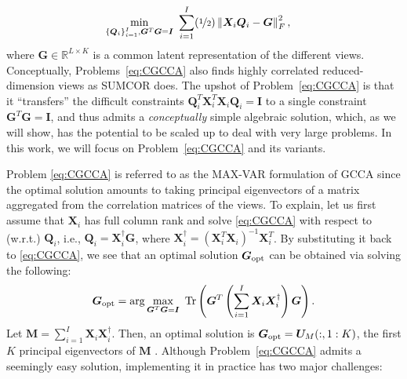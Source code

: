 \documentclass[10pt,journal]{IEEEtran}
\newcommand{\G}{\boldsymbol{G}}
\newcommand{\Q}{\boldsymbol{Q}}
\newcommand{\X}{\boldsymbol{X}}
\begin{document}
\begin{equation}\label{eq:CGCCA}
\begin{aligned}
\min_{\{{\bm Q}_i\}_{i=1}^I,{\bm G}^T{\bm G}={\bm I}} &~\sum_{i=1}^{I}(\nicefrac{1}{2})\left\|{\bm X}_i{\bm Q}_i-{\bm G}\right\|_F^2,
\end{aligned}
\end{equation}
where ${\bm G}\in\mathbb{R}^{L\times K}$ is a common latent representation of the different views.
Conceptually, Problems~\eqref{eq:CGCCA} also finds highly correlated reduced-dimension views as SUMCOR does. 
The upshot of Problem~\eqref{eq:CGCCA} is that it ``transfers'' the difficult constraints ${\bm Q}_i^T\X_i^T\X_i\Q_i={\bm I}$ to a single constraint $\G^T\G={\bm I}$, and thus admits a {\em conceptually} simple algebraic solution, which, as we will show, has the potential to be scaled up to deal with very large problems.
In this work, we will focus on Problem~\eqref{eq:CGCCA} and its variants.

Problem \eqref{eq:CGCCA} is referred to as the MAX-VAR formulation of GCCA since the optimal solution amounts to taking principal eigenvectors of a matrix aggregated from the correlation matrices of the views.
To explain, let us first assume that ${\bm X}_i$ has full column rank
and solve \eqref{eq:CGCCA} with respect to (w.r.t.) $\Q_i$, i.e., ${\bm Q}_i={\bm X}_i^\dag{\bm G}$, where ${\bm X}_i^\dag=({\bm X}_i^T{\bm X}_i)^{-1}{\bm X}_i^T$. By substituting it back to \eqref{eq:CGCCA}, we see that an optimal solution ${\bm G}_{\rm opt}$ can be obtained via solving the following:
\begin{equation}
\begin{aligned}
{\bm G}_{\rm opt} = \arg\max_{{\bm G}^T{\bm G} = {\bm I}} ~ {\rm Tr}\left({\bm G}^T\left(\sum_{i=1}^I {\bm X}_i{\bm X}_i^\dag\right){\bm G}\right). \label{eq:new_obj}
\end{aligned}
\end{equation}
Let ${\bm M} = \sum_{i=1}^I {\bm X}_i{\bm X}_i^\dag$.
Then, an optimal solution is ${\bm G}_{\rm opt}={\bm U}_M(:,1:K)$, 
the first $K$ principal eigenvectors of ${\bm M}$ \cite{GHGolub1996}.
Although Problem~\eqref{eq:CGCCA} admits a seemingly easy solution, implementing it in practice has two major challenges:
\end{document}
